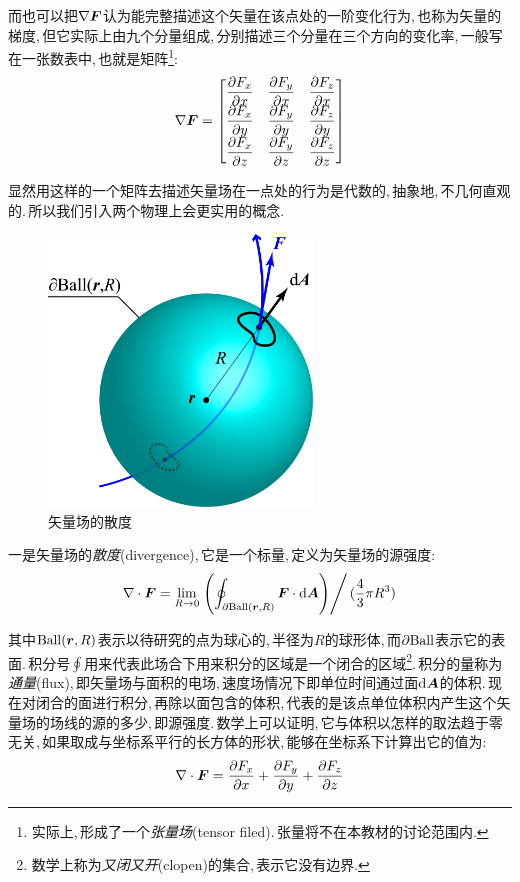 而也可以把\(\nabla \boldsymbol{F}\)认为能完整描述这个矢量在该点处的一阶变化行为,\,也称为矢量的梯度,\,但它实际上由九个分量组成,\,分别描述三个分量在三个方向的变化率,\,一般写在一张数表中,\,也就是矩阵\footnote{实际上,\,形成了一个\emph{张量场}(tensor filed).\,张量将不在本教材的讨论范围内.}:
\[\nabla \boldsymbol{F}=\begin{bmatrix}
\dfrac{\partial F_x}{\partial x}&\dfrac{\partial F_y}{\partial x}&\dfrac{\partial F_z}{\partial x}\\[3pt]
\dfrac{\partial F_x}{\partial y}&\dfrac{\partial F_y}{\partial y}&\dfrac{\partial F_z}{\partial y}\\[3pt]
\dfrac{\partial F_x}{\partial z}&\dfrac{\partial F_y}{\partial z}&\dfrac{\partial F_z}{\partial z}
\end{bmatrix}\]

显然用这样的一个矩阵去描述矢量场在一点处的行为是代数的,\,抽象地,\,不几何直观的.\,所以我们引入两个物理上会更实用的概念.

\begin{figure}
\centering
\includegraphics[width=7cm]{image/7-1-4.png}
\caption{矢量场的散度}
\end{figure}
一是矢量场的\emph{散度}(divergence),\,它是一个标量,\,定义为矢量场的源强度:
\[\nabla\cdot \boldsymbol{F}=\lim_{R\to 0}\left.\left(\oint_{\partial {\rm Ball}(\boldsymbol{r},R)}\boldsymbol{F}\cdot \textrm{d}\boldsymbol{A}\right)\right/(\frac{4}{3}\pi R^3)\]

其中\({\rm Ball}(\boldsymbol{r},R)\)表示以待研究的点为球心的,\,半径为\(R\)的球形体,\,而\(\partial {\rm Ball}\)表示它的表面.\,积分号\(\oint\)用来代表此场合下用来积分的区域是一个闭合的区域\footnote{数学上称为\emph{又闭又开}(clopen)的集合,\,表示它没有边界.}.\,积分的量称为\emph{通量}(flux),\,即矢量场与面积的电场,\,速度场情况下即单位时间通过面\(\textrm{d} \boldsymbol{A}\)的体积.\,现在对闭合的面进行积分,\,再除以面包含的体积,\,代表的是该点单位体积内产生这个矢量场的场线的源的多少,\,即源强度.\,数学上可以证明,\,它与体积以怎样的取法趋于零无关,\,如果取成与坐标系平行的长方体的形状,\,能够在坐标系下计算出它的值为:
\[\nabla\cdot\boldsymbol{F}=\frac{\partial F_x}{\partial x}+\frac{\partial F_y}{\partial y}+\frac{\partial F_z}{\partial z}\]

